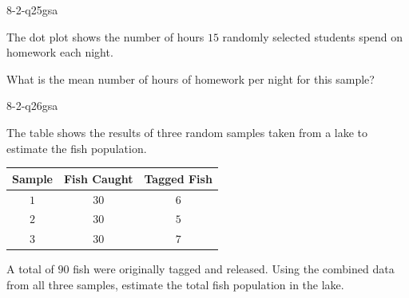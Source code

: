 \begin{practiceQuestion}{8-2-q25}{gsa}
\begin{questionText}
The dot plot shows the number of hours $15$ randomly selected students spend on homework each night.

\begin{center}
\end{center}

What is the mean number of hours of homework per night for this sample?
\end{questionText}
\end{practiceQuestion}

\begin{practiceQuestion}{8-2-q26}{gsa}
\begin{questionText}
The table shows the results of three random samples taken from a lake to estimate the fish population.

\begin{center}
\begin{tabular}{|c|c|c|}
\hline
\textbf{Sample} & \textbf{Fish Caught} & \textbf{Tagged Fish} \\
\hline
$1$ & $30$ & $6$ \\
$2$ & $30$ & $5$ \\
$3$ & $30$ & $7$ \\
\hline
\end{tabular}
\end{center}

A total of $90$ fish were originally tagged and released. Using the combined data from all three samples, estimate the total fish population in the lake.
\end{questionText}
\end{practiceQuestion}

